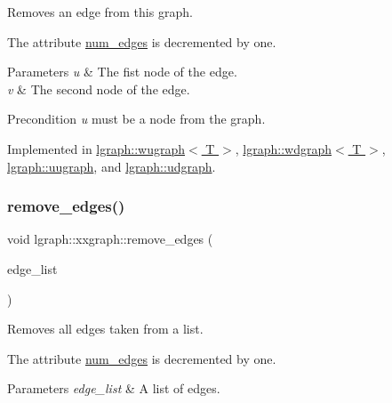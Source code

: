 Removes an edge from this graph. 

The attribute \hyperlink{classlgraph_1_1xxgraph_a6765a9a3be42f6e0f824635c593b35d7}{num\+\_\+edges} is decremented by one. 
\begin{DoxyParams}{Parameters}
{\em u} & The fist node of the edge. \\
\hline
{\em v} & The second node of the edge. \\
\hline
\end{DoxyParams}
\begin{DoxyPrecond}{Precondition}
{\itshape u} must be a node from the graph. 
\end{DoxyPrecond}


Implemented in \hyperlink{classlgraph_1_1wugraph_a3debc0be0d08b7cfcbe942aadbe81e1f}{lgraph\+::wugraph$<$ T $>$}, \hyperlink{classlgraph_1_1wdgraph_a6bdc75a07568928bc179dde03a814366}{lgraph\+::wdgraph$<$ T $>$}, \hyperlink{classlgraph_1_1uugraph_ae38adf44fd8f44d7f940710a0f8f3b35}{lgraph\+::uugraph}, and \hyperlink{classlgraph_1_1udgraph_af1225a134bea314254c03e18a18a41d2}{lgraph\+::udgraph}.

\mbox{\label{classlgraph_1_1xxgraph_aef7c4bf62f3f4db362b2d3accb3b6d3d}} 
\subsubsection{\texorpdfstring{remove\+\_\+edges()}{remove\_edges()}}
{\footnotesize\ttfamily void lgraph\+::xxgraph\+::remove\+\_\+edges (\begin{DoxyParamCaption}\item[{const std\+::vector$<$ \hyperlink{namespacelgraph_a76bd7d50719f03de7a85db259d80d572}{edge} $>$ \&}]{edge\+\_\+list }\end{DoxyParamCaption})\hspace{0.3cm}{\ttfamily [inherited]}}



Removes all edges taken from a list. 

The attribute \hyperlink{classlgraph_1_1xxgraph_a6765a9a3be42f6e0f824635c593b35d7}{num\+\_\+edges} is decremented by one. 
\begin{DoxyParams}{Parameters}
{\em edge\+\_\+list} & A list of edges. \\
\hline
\end{DoxyParams}
\mbox{\label{classlgraph_1_1xxgraph_a5b9e033f38a3ab34734be61aa9344c84}} 
